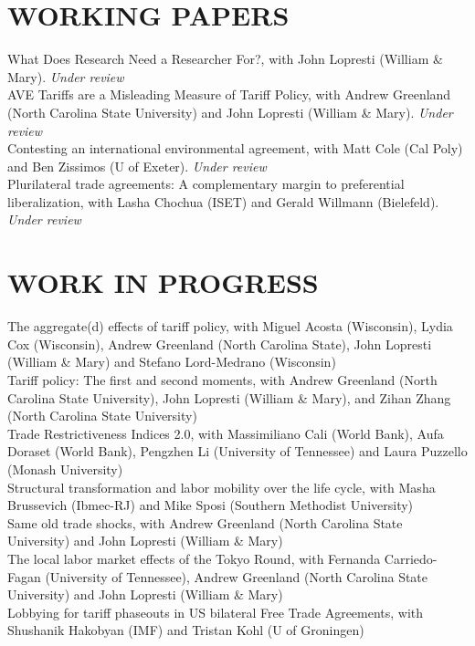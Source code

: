 \documentclass[11pt]{res}
\begin{document}
\begin{resume}
\section{WORKING PAPERS}\vspace{1.5mm}
What Does Research Need a Researcher For?, with John Lopresti (William \& Mary). \emph{Under review}\vspace{1.5mm}\\
AVE Tariffs are a Misleading Measure of Tariff Policy, with Andrew Greenland (North Carolina State University) and John Lopresti (William \& Mary). \emph{Under review}\vspace{1.5mm}\\
Contesting an international environmental agreement, with Matt Cole (Cal Poly) and Ben Zissimos (U of Exeter). \emph{Under review}\vspace{1.5mm}\\
Plurilateral trade agreements: A complementary margin to preferential liberalization, with Lasha Chochua (ISET) and Gerald Willmann (Bielefeld). \emph{Under review}\vspace{1.5mm}\\

\section{WORK IN PROGRESS}\vspace{1.5mm}
The aggregate(d) effects of tariff policy, with Miguel Acosta (Wisconsin), Lydia Cox (Wisconsin), Andrew Greenland (North Carolina State), John Lopresti (William \& Mary) and Stefano Lord-Medrano (Wisconsin)\vspace{1.5mm}\\
Tariff policy: The first and second moments, with Andrew Greenland (North Carolina State University), John Lopresti (William \& Mary), and Zihan Zhang (North Carolina State University)\vspace{1.5mm}\\
Trade Restrictiveness Indices 2.0, with Massimiliano Cali (World Bank), Aufa Doraset (World Bank), Pengzhen Li (University of Tennessee) and Laura Puzzello (Monash University)\vspace{1.5mm}\\
Structural transformation and labor mobility over the life cycle, with Masha Brussevich (Ibmec-RJ) and Mike Sposi (Southern Methodist University)\vspace{1.5mm}\\
Same old trade shocks, with Andrew Greenland (North Carolina State University) and John Lopresti (William \& Mary)\vspace{1.5mm}\\
The local labor market effects of the Tokyo Round, with Fernanda Carriedo-Fagan (University of Tennessee), Andrew Greenland (North Carolina State University) and John Lopresti (William \& Mary)\vspace{1.5mm}\\
Lobbying for tariff phaseouts in US bilateral Free Trade Agreements, with Shushanik Hakobyan (IMF) and Tristan Kohl (U of Groningen)



\end{resume}
\end{document}
